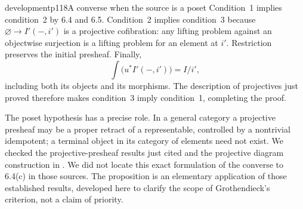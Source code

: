 \begin{dcomment}{development}{p118}{A converse when the source is a poset}
Condition~1 implies condition~2 by 6.4 and 6.5. Condition~2 implies condition~3 because $\varnothing\to I'(-,i')$ is a projective cofibration: any lifting problem against an objectwise surjection is a lifting problem for an element at $i'$. Restriction preserves the initial presheaf. Finally,
\[
 \int\bigl(u^*I'(-,i')\bigr)=I/i',
\]
including both its objects and its morphisms. The description of projectives just proved therefore makes condition~3 imply condition~1, completing the proof.

The poset hypothesis has a precise role. In a general category a projective presheaf may be a proper retract of a representable, controlled by a nontrivial idempotent; a terminal object in its category of elements need not exist. We checked the projective-presheaf results just cited and the projective diagram construction in \citet[\S12.3]{Riehl2014}. We did not locate this exact formulation of the converse to 6.4(c) in those sources. The proposition is an elementary application of those established results, developed here to clarify the scope of Grothendieck's criterion, not a claim of priority.
\end{dcomment}


